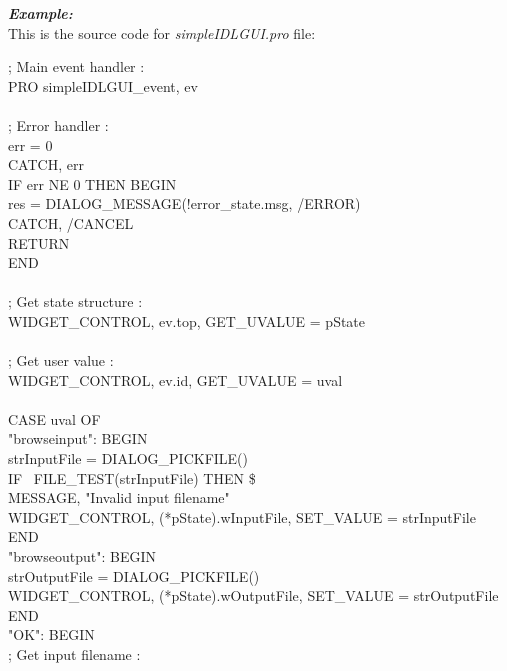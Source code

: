 \emph{\textbf{Example:}}\\
\indent This is the source code for \emph{simpleIDLGUI.pro} file:\\
\begin{scriptsize}
\indent ; Main event handler :\\
\indent PRO simpleIDLGUI\_event, ev\\
\\
\indent ; Error handler :\\
\indent err = 0\\
\indent CATCH, err\\
\indent IF err NE 0 THEN BEGIN\\
\indent \indent res = DIALOG\_MESSAGE(!error\_state.msg, /ERROR)\\
\indent \indent CATCH, /CANCEL\\
\indent \indent RETURN\\
\indent END\\
\\
\indent ; Get state structure :\\
\indent WIDGET\_CONTROL, ev.top, GET\_UVALUE = pState\\
\\
\indent ; Get user value :\\
\indent WIDGET\_CONTROL, ev.id, GET\_UVALUE = uval\\
\\
\indent CASE uval OF\\
\indent \indent "browseinput": BEGIN\\
\indent \indent \indent strInputFile = DIALOG\_PICKFILE()\\
\indent \indent \indent IF ~FILE\_TEST(strInputFile) THEN \$\\
\indent \indent \indent \indent MESSAGE, "Invalid input filename"\\
\indent \indent \indent WIDGET\_CONTROL, (*pState).wInputFile, SET\_VALUE = strInputFile\\
\indent \indent END\\
\indent \indent "browseoutput": BEGIN\\
\indent \indent \indent strOutputFile = DIALOG\_PICKFILE()\\
\indent \indent \indent WIDGET\_CONTROL, (*pState).wOutputFile, SET\_VALUE = strOutputFile\\
\indent \indent END\\
\indent \indent "OK": BEGIN\\
\indent \indent \indent ; Get input filename :\\

\end{scriptsize}
